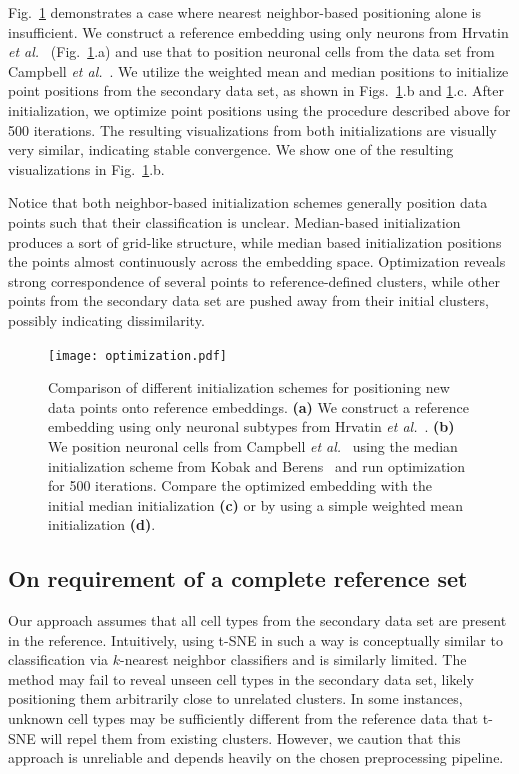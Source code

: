 \documentclass[runningheads]{llncs}
\newcommand{\etal}{\textit{et al.}}
\begin{document}
Fig.~\ref{fig:optimization} demonstrates a case where nearest neighbor-based
positioning alone is insufficient. We construct a reference embedding using
only neurons from Hrvatin \etal~\cite{Hrvatin2018} (Fig.~\ref{fig:optimization}.a) and use that to position neuronal cells from the data
set from Campbell \etal~\cite{Campbell2017}. We utilize the weighted mean and
median positions to initialize point positions from the secondary data set,
as shown in Figs.~\ref{fig:optimization}.b and \ref{fig:optimization}.c. After initialization, we optimize point positions using
the procedure described above for 500 iterations. The resulting
visualizations from both initializations are visually very similar,
indicating stable convergence. We show one of the resulting visualizations in
Fig.~\ref{fig:optimization}.b.

Notice that both neighbor-based initialization schemes generally position data
points such that their classification is unclear. Median-based initialization
produces a sort of grid-like structure, while median based initialization
positions the points almost continuously across the embedding space.
Optimization reveals strong correspondence of several points to
reference-defined clusters, while other points from the secondary data set
are pushed away from their initial clusters, possibly indicating
dissimilarity.


\begin{figure}[htbp]
  \texttt{[image: optimization.pdf]}
  \caption{Comparison of different initialization schemes for positioning new
   data points onto reference embeddings. {\bf (a)} We construct a reference
   embedding using only neuronal subtypes from Hrvatin \etal~\cite{Hrvatin2018}. {\bf (b)} We position neuronal cells from
   Campbell \etal~\cite{Campbell2017} using the median initialization scheme
   from Kobak and Berens~\cite{Kobak2019} and run optimization for 500
   iterations. Compare the optimized embedding with the initial median
   initialization {\bf (c)} or by using a simple weighted mean
   initialization {\bf (d)}.}
  \label{fig:optimization}
\end{figure}

\subsection{On requirement of a complete reference set}

Our approach assumes that all cell types from the secondary data set are
present in the reference. Intuitively, using t-SNE in such a way is
conceptually similar to classification via $k$-nearest neighbor classifiers
and is similarly limited. The method may fail to reveal unseen cell types in
the secondary data set, likely positioning them arbitrarily close to
unrelated clusters. In some instances, unknown cell types may be sufficiently
different from the reference data that t-SNE will repel them from existing
clusters. However, we caution that this approach is unreliable and depends
heavily on the chosen preprocessing pipeline.
\end{document}

